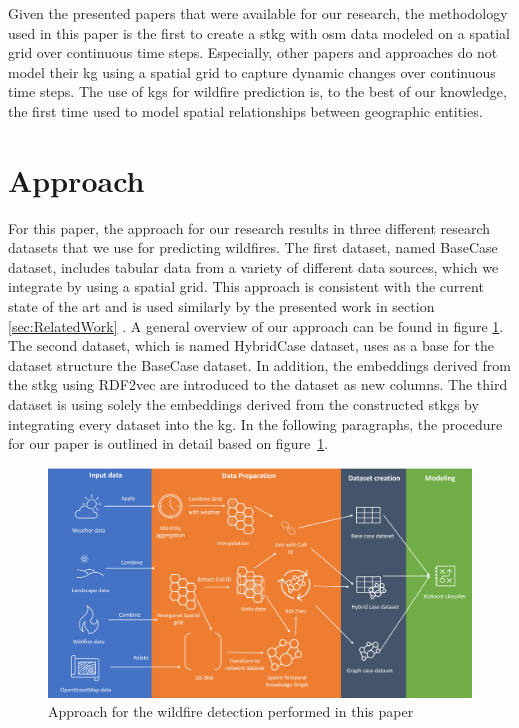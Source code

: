 \documentclass[
]{ceurart}
\begin{document}
Given the presented papers that were available for our research, the methodology used in this paper is the first to create a \gls*{stkg} with \gls*{osm} data modeled on a spatial grid over continuous time steps. Especially, other papers and approaches do not model their \gls*{kg} using a spatial grid to capture dynamic changes over continuous time steps. The use of \glspl*{kg} for wildfire prediction is, to the best of our knowledge, the first time used to model spatial relationships between geographic entities. %

\section{Approach} \label{cha:Approach}
For this paper, the approach for our research results in three different research datasets that we use for predicting wildfires. The first dataset, named BaseCase dataset, includes tabular data from a variety of different data sources, which we integrate by using a spatial grid. This approach is consistent with the current state of the art and is used similarly by the presented work in section \ref{sec:RelatedWork} \cite{Nami.2018, Kim.2019}. A general overview of our approach can be found in figure \ref{fig:Approach}. The second dataset, which is named HybridCase dataset, uses as a base for the dataset structure the BaseCase dataset. In addition, the embeddings derived from the \gls*{stkg} using RDF2vec are introduced to the dataset as new columns. The third dataset is using solely the embeddings derived from the constructed \glspl*{stkg} by integrating every dataset into the \gls*{kg}. In the following paragraphs, the procedure for our paper is outlined in detail based on figure~\ref{fig:Approach}.

\begin{figure}[ht]
	\centering
	\includegraphics[width = 1\textwidth]{img/Approach.png}
	\caption{Approach for the wildfire detection performed in this paper}
	\label{fig:Approach}
\end{figure}
\end{document}
